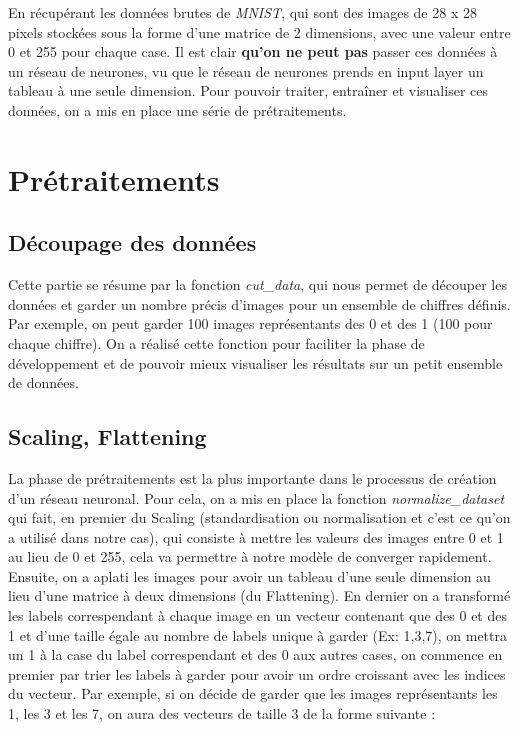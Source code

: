 \documentclass[oneside,13pt,a4paper]{report}
\begin{document}
En récupérant les données brutes de \textit{MNIST}, qui sont des images de 28 x 28 pixels stockées sous la forme d'une matrice de 2 dimensions, avec une valeur entre 0 et 255 pour chaque case. Il est clair \textbf{qu'on ne peut pas} passer ces données à un réseau de neurones, vu que le réseau de neurones prends en input layer un tableau à une seule dimension.
Pour pouvoir traiter, entraîner et visualiser ces données, on a mis en place une série de prétraitements.

\section{Prétraitements} 

\subsection{Découpage des données}

Cette partie se résume par la fonction \textit{cut\_data}, qui nous permet de découper les données et garder un nombre précis d'images pour un ensemble de chiffres définis. Par exemple, on peut garder 100 images représentants des 0 et des 1 (100 pour chaque chiffre). On a réalisé cette fonction pour faciliter la phase de développement et de pouvoir mieux visualiser les résultats sur un petit ensemble de données.
\subsection{Scaling, Flattening}

La phase de prétraitements est la plus importante dans le processus de création d’un réseau neuronal. Pour cela, on a mis en place
la fonction \textit{normalize\_dataset} qui fait, en premier du Scaling (standardisation ou normalisation et c'est ce qu'on a utilisé dans notre cas), qui consiste à mettre les valeurs des images entre 0 et 1 au lieu de 0 et 255, cela va permettre à notre modèle de converger rapidement. Ensuite, on a aplati les images pour avoir un tableau d'une seule dimension au lieu d'une matrice à deux dimensions (du Flattening). En dernier on a transformé les labels correspendant à chaque image en un vecteur contenant que des 0 et des 1 et d'une taille égale au nombre de labels unique à garder (Ex: 1,3,7), on mettra un 1 à la case du label correspendant et des 0 aux autres cases, on commence en premier par trier les labels à garder pour avoir un ordre croissant avec les indices du vecteur. Par exemple, si on décide de garder que les images représentants les 1, les 3 et les 7, on aura des vecteurs de taille 3 de la forme suivante : 
\end{document}
